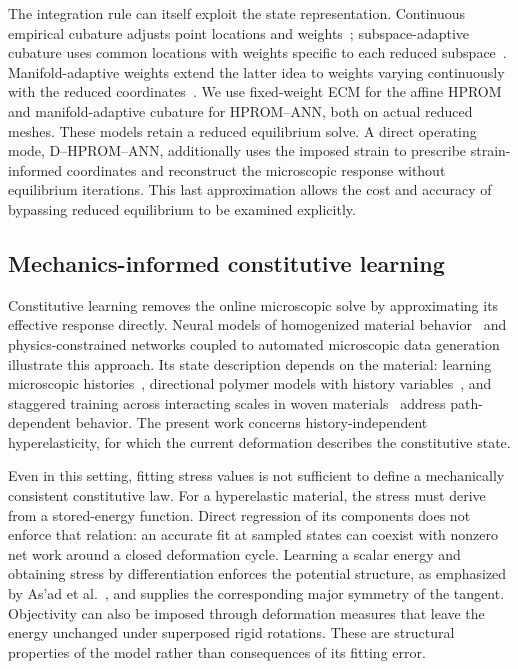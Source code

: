 The integration rule can itself exploit the state representation. Continuous empirical cubature adjusts point locations and weights~\cite{Hernandez2024}; subspace-adaptive cubature uses common locations with weights specific to each reduced subspace~\cite{Bravo2024}. Manifold-adaptive weights extend the latter idea to weights varying continuously with the reduced coordinates~\cite{hernandez2026}. We use fixed-weight ECM for the affine HPROM and manifold-adaptive cubature for HPROM--ANN, both on actual reduced meshes. These models retain a reduced equilibrium solve. A direct operating mode, D--HPROM--ANN, additionally uses the imposed strain to prescribe strain-informed coordinates and reconstruct the microscopic response without equilibrium iterations. This last approximation allows the cost and accuracy of bypassing reduced equilibrium to be examined explicitly.

\subsection{Mechanics-informed constitutive learning}
Constitutive learning removes the online microscopic solve by approximating its effective response directly. Neural models of homogenized material behavior~\cite{Aldakheel2023} and physics-constrained networks coupled to automated microscopic data generation~\cite{kalina2023} illustrate this approach. Its state description depends on the material: learning microscopic histories~\cite{Liu2022}, directional polymer models with history variables~\cite{Ghaderi2020}, and staggered training across interacting scales in woven materials~\cite{AsadFarhat2026} address path-dependent behavior. The present work concerns history-independent hyperelasticity, for which the current deformation describes the constitutive state.

Even in this setting, fitting stress values is not sufficient to define a mechanically consistent constitutive law. For a hyperelastic material, the stress must derive from a stored-energy function. Direct regression of its components does not enforce that relation: an accurate fit at sampled states can coexist with nonzero net work around a closed deformation cycle. Learning a scalar energy and obtaining stress by differentiation enforces the potential structure, as emphasized by As'ad et al.~\cite{asad2022}, and supplies the corresponding major symmetry of the tangent. Objectivity can also be imposed through deformation measures that leave the energy unchanged under superposed rigid rotations. These are structural properties of the model rather than consequences of its fitting error.

